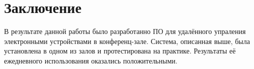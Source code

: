\clearpage

\section*{Заключение}

В результате данной работы было разработанно ПО для удалённого упраления электронными устройствами в конференц-зале. Система,
описанная выше, была установлена в одном из залов и протестирована на практике. Результаты её ежедневного использования 
оказались положительными.

\clearpage

\nocite{*}
\printbibliography[heading=bibintoc, title=Список источников]
